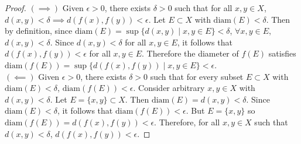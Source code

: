 \documentclass[11pt]{article}
\begin{document}
\begin{exercise}{9}
    \begin{proof}
        $(\implies)$ Given $\epsilon > 0$, there exists $\delta > 0$ such that for all $x, y \in X$, $d(x, y) < \delta \implies d(f(x), f(y)) < \epsilon$. Let $E \subset X$ with $\mathrm{diam}(E) < \delta$. Then by definition, since $\mathrm{diam}(E) = \sup \{ d(x, y) \mid x, y \in E \} < \delta$, $\forall x, y \in E$, $d(x, y) < \delta$. Since $d(x, y) < \delta$ for all $x, y \in E$, it follows that $d(f(x), f(y)) < \epsilon$ for all $x, y \in E$. Therefore the diameter of $f(E)$ satisfies $\mathrm{diam} (f(E)) = \sup \{ d(f(x), f(y)) \mid x, y \in E \} < \epsilon$. \\

        $(\impliedby)$ Given $\epsilon > 0$, there exists $\delta > 0$ such that for every subset $E \subset X $ with $\mathrm{diam}(E) < \delta$, $\mathrm{diam}(f(E)) < \epsilon$. Consider arbitrary $x, y \in X$ with $d(x, y) < \delta$. Let $E = \{ x, y \} \subset X$. Then $\mathrm{diam}(E) = d(x, y) < \delta$. Since $\mathrm{diam}(E) < \delta$, it follows that $\mathrm{diam}(f(E)) < \epsilon$. But $E = \{ x, y \}$ so $\mathrm{diam}(f(E)) = d(f(x), f(y)) < \epsilon$. Therefore, for all $x, y \in X$ such that $d(x, y) < \delta$, $d(f(x), f(y)) < \epsilon$. 
    \end{proof}
\end{exercise}
\end{document}
